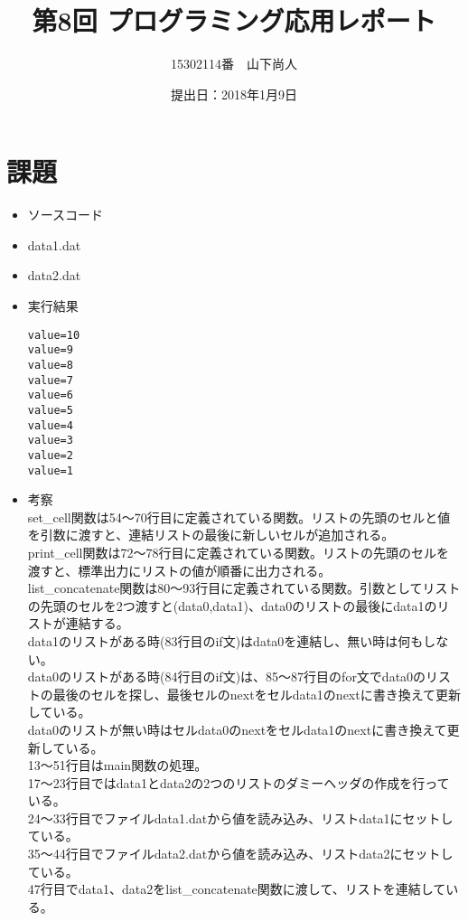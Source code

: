 \documentclass[a4paper]{jsarticle}
\title{第8回 プログラミング応用レポート}
\author{15302114番　山下尚人}
\date{提出日：2018年1月9日}
\begin{document}
\maketitle%

\section*{課題}
	\begin{itemize}
	\item ソースコード
		 
		\mbox{}\newline
	\item data1.dat
		 
		\mbox{}\newline
	\item data2.dat
		 
		\mbox{}\newline
	\item 実行結果
		\begin{lstlisting}
value=10
value=9
value=8
value=7
value=6
value=5
value=4
value=3
value=2
value=1
		\end{lstlisting}
		\mbox{}\newpage
	\item 考察\mbox{}\\
		set\_cell関数は54〜70行目に定義されている関数。リストの先頭のセルと値を引数に渡すと、連結リストの最後に新しいセルが追加される。\\
		
		print\_cell関数は72〜78行目に定義されている関数。リストの先頭のセルを渡すと、標準出力にリストの値が順番に出力される。\\
		
		list\_concatenate関数は80〜93行目に定義されている関数。引数としてリストの先頭のセルを2つ渡すと(data0,data1)、data0のリストの最後にdata1のリストが連結する。\\
		data1のリストがある時(83行目のif文)はdata0を連結し、無い時は何もしない。\\
		data0のリストがある時(84行目のif文)は、85〜87行目のfor文でdata0のリストの最後のセルを探し、最後セルのnextをセルdata1のnextに書き換えて更新している。\\
		data0のリストが無い時はセルdata0のnextをセルdata1のnextに書き換えて更新している。\\
		
		13〜51行目はmain関数の処理。\\
		17〜23行目ではdata1とdata2の2つのリストのダミーヘッダの作成を行っている。\\
		24〜33行目でファイルdata1.datから値を読み込み、リストdata1にセットしている。\\
		35〜44行目でファイルdata2.datから値を読み込み、リストdata2にセットしている。\\
		47行目でdata1、data2をlist\_concatenate関数に渡して、リストを連結している。
	\end{itemize}
\end{document}
